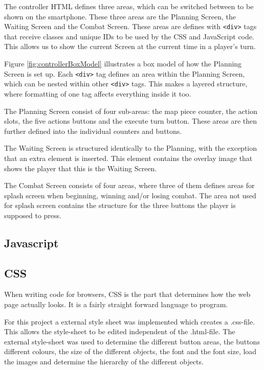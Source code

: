 The controller HTML defines three areas, which can be switched between to be shown on the smartphone. These three areas are the Planning Screen, the Waiting Screen and the Combat Screen. These areas are defines with \texttt{<div>} tags that receive classes and unique IDs to be used by the CSS and JavaScript code. This allows us to show the current Screen at the current time in a player's turn.

Figure \ref{fig:controllerBoxModel} illustrates a box model of how the Planning Screen is set up. Each \texttt{<div>} tag defines an area within the Planning Screen, which can be nested within other \texttt{<div>} tags. This makes a layered structure, where formatting of one tag affects everything inside it too.

The Planning Screen consist of four sub-areas: the map piece counter, the action slots, the five actions buttons and the execute turn button. These areas are then further defined into the individual counters and buttons.

The Waiting Screen is structured identically to the Planning, with the exception that an extra element is inserted. This element contains the overlay image that shows the player that this is the Waiting Screen.

The Combat Screen consists of four areas, where three of them defines areas for splash screen when beginning, winning and/or losing combat. The area not used for splash screen contains the structure for the three buttons the player is supposed to press.

\subsection{Javascript}\label{controllerJavascript}


\subsection{CSS}\label{controllerCSS}
When writing code for browsers, CSS is the part that determines how the web page actually looks. It is a fairly straight forward language to program. 

For this project a external style sheet was implemented which creates a .css-file. This allows the style-sheet to be edited independent of the .html-file. The external style-sheet was used to determine the different button areas, the buttons different colours, the size of the different objects, the font and the font size, load the images and determine the hierarchy of the different objects. 


